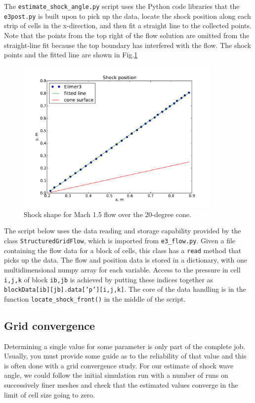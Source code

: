 The \texttt{estimate\_shock\_angle.py} script uses the Python code libraries 
that the \texttt{e3post.py} is built upon to pick up the data, 
locate the shock position along each strip of cells in the x-direction,
and then fit a straight line to the collected points.
Note that the points from the top right of the flow solution are omitted from the straight-line fit
because the top boundary has interfered with the flow.
The shock points and the fitted line are shown in Fig.\ref{cone20-shock-points-fig} 

\begin{figure}[htbp]
\begin{center}
\includegraphics[width=10cm]{../2D/cone20-simple/shock-shape.pdf}
\end{center}
\caption{Shock shape for Mach 1.5 flow over the 20-degree cone.}
\label{cone20-shock-points-fig}
\end{figure}

The script below uses the data reading and storage capability provided by 
the class \texttt{StructuredGridFlow}, which is imported from \texttt{e3\_flow.py}.
Given a file containing the flow data for a block of cells, this class has a \texttt{read} 
method that picks up the data.
The flow and position data is stored in a dictionary, with one multidimensional numpy array 
for each variable.
Access to the pressure in cell \texttt{i,j,k} of block \texttt{ib,jb} is achieved by
putting these indices together as \texttt{blockData[ib][jb].data['p'][i,j,k]}.
The core of the data handling is in the function \texttt{locate\_shock\_front()}
in the middle of the script.

\noindent
\topbar

\bottombar

\subsection{Grid convergence}
%
Determining a single value for some parameter is only part of the complete job.
Usually, you must provide some guide as to the reliability of that value and
this is often done with a grid convergence study.
For our estimate of shock wave angle, we could follow the initial simulation run with a 
number of runs on successively finer meshes and check that the estimated values converge 
in the limit of cell size going to zero.

